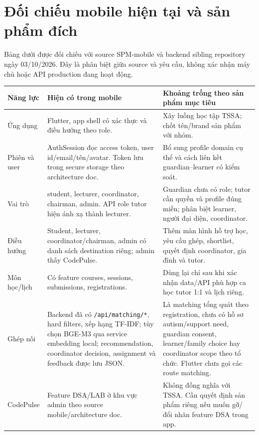 \documentclass[11pt,a4paper]{article}
\begin{document}
\section{Đối chiếu mobile hiện tại và sản phẩm đích}

Bảng dưới được đối chiếu với source SPM-mobile và backend sibling repository ngày 03/10/2026. Đây là phân biệt giữa source và yêu cầu, không xác nhận máy chủ hoặc API production đang hoạt động.

\begin{tabularx}{\textwidth}{p{3.0cm}p{5.9cm}Y}
\toprule
\textbf{Năng lực} & \textbf{Hiện có trong mobile} & \textbf{Khoảng trống theo sản phẩm mục tiêu} \\
\midrule
Ứng dụng & Flutter, app shell có xác thực và điều hướng theo role. & Xây luồng học tập TSSA; chốt tên/brand sản phẩm với nhóm. \\
Phiên và user & AuthSession đọc access token, user id/email/tên/avatar. Token lưu trong secure storage theo architecture doc. & Bổ sung profile domain cụ thể và cách liên kết guardian--learner có kiểm soát. \\
Vai trò & student, lecturer, coordinator, chairman, admin. API role tutor hiện ánh xạ thành lecturer. & Guardian chưa có role; tutor cần quyền và profile đúng miền; phân biệt learner, người đại diện, coordinator. \\
Điều hướng & Student, lecturer, coordinator/chairman, admin có danh sách destination riêng; admin thấy CodePulse. & Thêm màn hình hỗ trợ học, yêu cầu ghép, shortlist, quyết định coordinator, gia đình và tutor. \\
Môn học/lịch & Có feature courses, sessions, submissions, registrations. & Dùng lại chỉ sau khi xác nhận data/API phù hợp ca học tutor 1:1 và lịch riêng. \\
Ghép nối & Backend đã có \texttt{/api/matching/*}, hard filters, xếp hạng TF-IDF; tùy chọn BGE-M3 qua service embedding local; recommendation, coordinator decision, assignment và feedback được lưu JSON. & Là matching tổng quát theo registration, chưa có hồ sơ autism/support need, guardian consent, learner/family choice hay coordinator scope theo tổ chức. Flutter chưa gọi các route matching. \\
CodePulse & Feature DSA/LAB ở khu vực admin theo source mobile/architecture doc. & Không đồng nghĩa với TSSA. Cần quyết định sản phẩm riêng nếu muốn gỡ/đổi nhãn feature DSA trong app. \\
\bottomrule
\end{tabularx}
\end{document}
